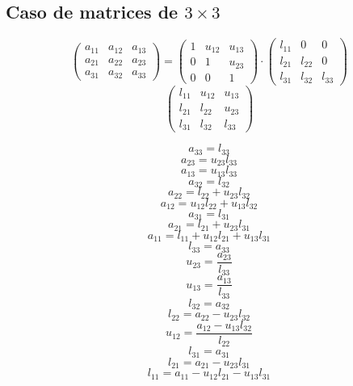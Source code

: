 \documentclass[10pt,a4paper,dvipdfmx]{article}
\begin{document}
\subsection{Caso de matrices de $3\times 3$ }
$$ \left( 
\begin{array}{ccc}
a_{{1}{1}} & a_{{1}{2}} & a_{{1}{3}} \\
a_{{2}{1}} & a_{{2}{2}} & a_{{2}{3}} \\
a_{{3}{1}} & a_{{3}{2}} & a_{{3}{3}} 
 \end{array}
\right)
 = \left( 
\begin{array}{ccc}
1 & u_{{1}{2}} & u_{{1}{3}} \\
0 & 1 & u_{{2}{3}} \\
0 & 0 & 1 
 \end{array}
\right)
 \cdot \left( 
\begin{array}{ccc}
l_{{1}{1}} & 0 & 0 \\
l_{{2}{1}} & l_{{2}{2}} & 0 \\
l_{{3}{1}} & l_{{3}{2}} & l_{{3}{3}} 
 \end{array}
\right)
 $$
$$ \left( 
\begin{array}{ccc}
l_{{1}{1}} & u_{{1}{2}} & u_{{1}{3}} \\
l_{{2}{1}} & l_{{2}{2}} & u_{{2}{3}} \\
l_{{3}{1}} & l_{{3}{2}} & l_{{3}{3}} 
 \end{array}
\right)
 $$
\begin{multicols}{2}
$$ a_{{3}{3}} = l_{{3}{3}} $$
$$ a_{{2}{3}} = u_{{2}{3}} l_{{3}{3}} $$
$$ a_{{1}{3}} = u_{{1}{3}} l_{{3}{3}} $$
$$ a_{{3}{2}} = l_{{3}{2}} $$
$$ a_{{2}{2}} = l_{{2}{2}} + u_{{2}{3}} l_{{3}{2}} $$
$$ a_{{1}{2}} = u_{{1}{2}} l_{{2}{2}} + u_{{1}{3}} l_{{3}{2}} $$
$$ a_{{3}{1}} = l_{{3}{1}} $$
$$ a_{{2}{1}} = l_{{2}{1}} + u_{{2}{3}} l_{{3}{1}} $$
$$ a_{{1}{1}} = l_{{1}{1}} + u_{{1}{2}} l_{{2}{1}} + u_{{1}{3}} l_{{3}{1}} $$
\vfill\null
\columnbreak
$$ l_{{3}{3}} = a_{{3}{3}} $$
$$ u_{{2}{3}} = \dfrac{a_{{2}{3}}}{l_{{3}{3}}} $$
$$ u_{{1}{3}} = \dfrac{a_{{1}{3}}}{l_{{3}{3}}} $$
$$ l_{{3}{2}} = a_{{3}{2}} $$
$$ l_{{2}{2}} = a_{{2}{2}}- u_{{2}{3}} l_{{3}{2}} $$
$$ u_{{1}{2}} = \dfrac{a_{{1}{2}}- u_{{1}{3}} l_{{3}{2}}}{l_{{2}{2}}} $$
$$ l_{{3}{1}} = a_{{3}{1}} $$
$$ l_{{2}{1}} = a_{{2}{1}}- u_{{2}{3}} l_{{3}{1}} $$
$$ l_{{1}{1}} = a_{{1}{1}}- u_{{1}{2}} l_{{2}{1}}- u_{{1}{3}} l_{{3}{1}} $$
\end{multicols}
\end{document}
